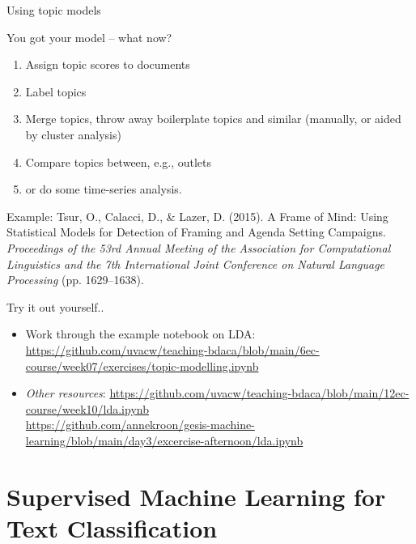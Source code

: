 \begin{frame}{Using topic models}
	
You got your model -- what now?
	
	\begin{enumerate}
		\item Assign topic scores to documents
		\item Label topics
		\item Merge topics, throw away boilerplate topics and similar (manually, or aided by cluster analysis)
		\item Compare topics between, e.g., outlets
		\item or do some time-series analysis.
	\end{enumerate}
	
	
	Example:
	\tiny{Tsur, O., Calacci, D., \& Lazer, D. (2015). A Frame of Mind: Using Statistical Models for Detection of Framing and Agenda Setting Campaigns. \textit{Proceedings of the 53rd Annual Meeting of the Association for Computational Linguistics and the 7th International Joint Conference on Natural Language Processing} (pp. 1629–1638).}
	
\end{frame}


\begin{frame}[plain]
	
	\begin{block}{Try it out yourself..}
		\footnotesize
		\begin{itemize}
			\item Work through the example notebook on LDA: \url{https://github.com/uvacw/teaching-bdaca/blob/main/6ec-course/week07/exercises/topic-modelling.ipynb}
			\item \emph{Other resources}: 
			\url{https://github.com/uvacw/teaching-bdaca/blob/main/12ec-course/week10/lda.ipynb} \\
			\url{https://github.com/annekroon/gesis-machine-learning/blob/main/day3/excercise-afternoon/lda.ipynb}
		\end{itemize}
	\end{block}
	
\end{frame}



\section{Supervised Machine Learning for Text Classification}





